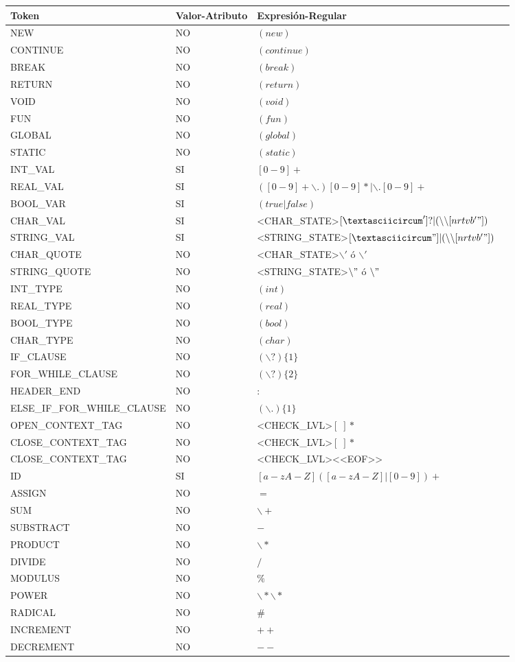 \documentclass[11pt, english]{article}
\begin{document}
	\begin{table}[H]
		\begin{tabular}{l|l|l|l}
			\toprule
			\textbf{Token} & \textbf{Valor-Atributo} & \textbf{Expresión-Regular}\\
			\midrule
			NEW & NO & $(new)$ \\
			CONTINUE & NO & $(continue)$ \\
			BREAK & NO & $(break)$ \\
			RETURN & NO & $(return)$ \\
			VOID & NO & $(void)$ \\
			FUN & NO & $(fun)$ \\
			GLOBAL & NO & $(global)$ \\
			STATIC	& NO & $(static)$ \\
			INT\_VAL & SI & $[0-9]+$ \\
			REAL\_VAL & SI & $([0-9]+\backslash.)[0-9]*|\backslash.[0-9]+$ \\
			BOOL\_VAR & SI & $(true|false)$ \\
			CHAR\_VAL & SI & <CHAR\_STATE>$[\textasciicircum']?|(\backslash \backslash[nrtvb'"])$ \\
			STRING\_VAL & SI & <STRING\_STATE>$[\textasciicircum"]|(\backslash\backslash[nrtvb'"])$ \\
			CHAR\_QUOTE & NO & <CHAR\_STATE>$\backslash '$ ó $\backslash '$ \\
			STRING\_QUOTE & NO & <STRING\_STATE>$\backslash "$ ó $\backslash "$ \\
			INT\_TYPE & NO & $(int)$ \\
			REAL\_TYPE  & NO & $(real)$ \\
			BOOL\_TYPE & NO & $(bool)$ \\
			CHAR\_TYPE & NO & $(char)$ \\
			IF\_CLAUSE & NO & $(\backslash?)\{1\}$ \\
			FOR\_WHILE\_CLAUSE & NO & $(\backslash?)\{2\}$ \\
			HEADER\_END & NO & $:$ \\
			ELSE\_IF\_FOR\_WHILE\_CLAUSE & NO & $(\backslash.)\{1\}$ \\
			OPEN\_CONTEXT\_TAG & NO & <CHECK\_LVL>$[\;]*$ \\
			CLOSE\_CONTEXT\_TAG & NO & <CHECK\_LVL>$[\;]*$ \\
			CLOSE\_CONTEXT\_TAG & NO & <CHECK\_LVL><<EOF>> \\
			ID & SI & $[a-zA-Z]([a-zA-Z]|[0-9])+$ \\
			ASSIGN & NO & $=$ \\
			SUM & NO & $\backslash+$ \\
			SUBSTRACT & NO & $-$ \\
			PRODUCT & NO & $\backslash*$ \\
			DIVIDE & NO & $/$ \\
			MODULUS & NO & $\%$ \\
			POWER & NO & $\backslash*\backslash*$ \\
			RADICAL & NO & $\#$ \\
			INCREMENT & NO & $++$ \\
			DECREMENT & NO & $--$ \\
			\bottomrule
		\end{tabular}
	\end{table}
\end{document}
